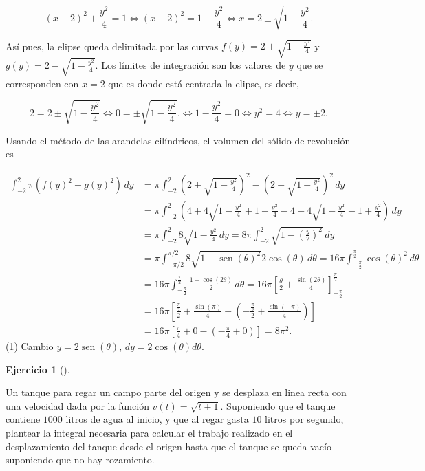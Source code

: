 \documentclass[
  a4paper,
]{scrreport}
\theoremstyle{definition}
\newtheorem{exercise}{Ejercicio}[chapter]
\theoremstyle{remark}
\begin{document}
\begin{tcolorbox}
\[
(x-2)^2+\frac{y^2}{4} = 1
\Leftrightarrow  (x-2)^2 = 1-\frac{y^2}{4}
\Leftrightarrow x = 2 \pm \sqrt{1-\frac{y^2}{4}}.
\]

Así pues, la elipse queda delimitada por las curvas
\(f(y) = 2+\sqrt{1-\frac{y^2}{4}}\) y
\(g(y) = 2-\sqrt{1-\frac{y^2}{4}}\). Los límites de integración son los
valores de \(y\) que se corresponden con \(x=2\) que es donde está
centrada la elipse, es decir,

\[
2 = 2 \pm \sqrt{1-\frac{y^2}{4}}
\Leftrightarrow 0 = \pm \sqrt{1-\frac{y^2}{4}}.
\Leftrightarrow 1-\frac{y^2}{4} = 0
\Leftrightarrow y^2 = 4
\Leftrightarrow y = \pm 2.
\]

Usando el método de las arandelas cilíndricos, el volumen del sólido de
revolución es

\begin{align*}
\int_{-2}^2 \pi (f(y)^2 -g(y)^2)\,dy
&= \pi \int_{-2}^2 \left(2+\sqrt{1-\frac{y^2}{4}}\right)^2 - \left(2-\sqrt{1-\frac{y^2}{4}}\right)^2 \,dy \\
&= \pi \int_{-2}^2 \left(4+4\sqrt{1-\frac{y^2}{4}} + 1-\frac{y^2}{4} - 4 + 4\sqrt{1-\frac{y^2}{4}} - 1+\frac{y^2}{4}\right) \,dy \\
&= \pi \int_{-2}^2 8\sqrt{1-\frac{y^2}{4}} \,dy
=8\pi \int_{-2}^2 \sqrt{1-\left(\frac{y}{2}\right)^2} \,dy \tag{1} \\
&= \pi \int_{-\pi/2}^{\pi/2} 8\sqrt{1-\operatorname{sen}(\theta)^2} 2\cos(\theta)\,d\theta
= 16\pi \int_{-\frac{\pi}{2}}^{\frac{\pi}{2}} \cos(\theta)^2\,d\theta \\
&= 16\pi \int_{-\frac{\pi}{2}}^{\frac{\pi}{2}} \frac{1+\cos(2\theta)}{2}\,d\theta
= 16\pi \left[\frac{\theta}{2} + \frac{\sin(2\theta)}{4}\right]_{-\frac{\pi}{2}}^{\frac{\pi}{2}} \\
&= 16\pi \left[\frac{\frac{\pi}{2}}{2} + \frac{\sin(\pi)}{4} - \left(-\frac{\frac{\pi}{2}}{2} + \frac{\sin(-\pi)}{4}\right)\right] \\
&= 16\pi \left[\frac{\pi}{4} + 0 - \left(-\frac{\pi}{4} + 0\right)\right]
= 8\pi^2.
\end{align*} (1) Cambio \(y = 2\operatorname{sen}(\theta)\),
\(dy = 2\cos(\theta)d\theta\).

\end{tcolorbox}

\begin{exercise}[]\protect\hypertarget{exr-4}{}\label{exr-4}

Un tanque para regar un campo parte del origen y se desplaza en linea
recta con una velocidad dada por la función \(v(t) = \sqrt{t+1}\).
Suponiendo que el tanque contiene \(1000\) litros de agua al inicio, y
que al regar gasta \(10\) litros por segundo, plantear la integral
necesaria para calcular el trabajo realizado en el desplazamiento del
tanque desde el origen hasta que el tanque se queda vacío suponiendo que
no hay rozamiento.

\end{exercise}
\end{document}
